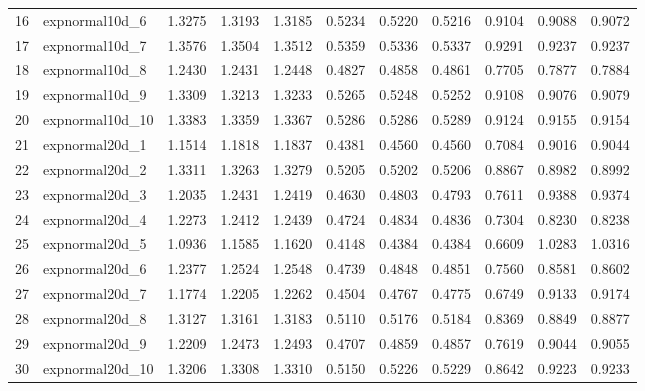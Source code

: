 \begin{table}[ht]
\begin{tabular}{rlrrrrrrrrr}
  16 & expnormal10d\_6  & 1.3275 & 1.3193 & 1.3185 & 0.5234 & 0.5220 & 0.5216 & 0.9104 & 0.9088 & 0.9072 \\ 
  17 & expnormal10d\_7  & 1.3576 & 1.3504 & 1.3512 & 0.5359 & 0.5336 & 0.5337 & 0.9291 & 0.9237 & 0.9237 \\ 
  18 & expnormal10d\_8  & 1.2430 & 1.2431 & 1.2448 & 0.4827 & 0.4858 & 0.4861 & 0.7705 & 0.7877 & 0.7884 \\ 
  19 & expnormal10d\_9  & 1.3309 & 1.3213 & 1.3233 & 0.5265 & 0.5248 & 0.5252 & 0.9108 & 0.9076 & 0.9079 \\ 
  20 & expnormal10d\_10 & 1.3383 & 1.3359 & 1.3367 & 0.5286 & 0.5286 & 0.5289 & 0.9124 & 0.9155 & 0.9154 \\ 
  21 & expnormal20d\_1  & 1.1514 & 1.1818 & 1.1837 & 0.4381 & 0.4560 & 0.4560 & 0.7084 & 0.9016 & 0.9044 \\ 
  22 & expnormal20d\_2  & 1.3311 & 1.3263 & 1.3279 & 0.5205 & 0.5202 & 0.5206 & 0.8867 & 0.8982 & 0.8992 \\ 
  23 & expnormal20d\_3  & 1.2035 & 1.2431 & 1.2419 & 0.4630 & 0.4803 & 0.4793 & 0.7611 & 0.9388 & 0.9374 \\ 
  24 & expnormal20d\_4  & 1.2273 & 1.2412 & 1.2439 & 0.4724 & 0.4834 & 0.4836 & 0.7304 & 0.8230 & 0.8238 \\ 
  25 & expnormal20d\_5  & 1.0936 & 1.1585 & 1.1620 & 0.4148 & 0.4384 & 0.4384 & 0.6609 & 1.0283 & 1.0316 \\ 
  26 & expnormal20d\_6  & 1.2377 & 1.2524 & 1.2548 & 0.4739 & 0.4848 & 0.4851 & 0.7560 & 0.8581 & 0.8602 \\ 
  27 & expnormal20d\_7  & 1.1774 & 1.2205 & 1.2262 & 0.4504 & 0.4767 & 0.4775 & 0.6749 & 0.9133 & 0.9174 \\ 
  28 & expnormal20d\_8  & 1.3127 & 1.3161 & 1.3183 & 0.5110 & 0.5176 & 0.5184 & 0.8369 & 0.8849 & 0.8877 \\ 
  29 & expnormal20d\_9  & 1.2209 & 1.2473 & 1.2493 & 0.4707 & 0.4859 & 0.4857 & 0.7619 & 0.9044 & 0.9055 \\ 
  30 & expnormal20d\_10 & 1.3206 & 1.3308 & 1.3310 & 0.5150 & 0.5226 & 0.5229 & 0.8642 & 0.9223 & 0.9233 \\ 
   \hline
\end{tabular}
\end{table}
